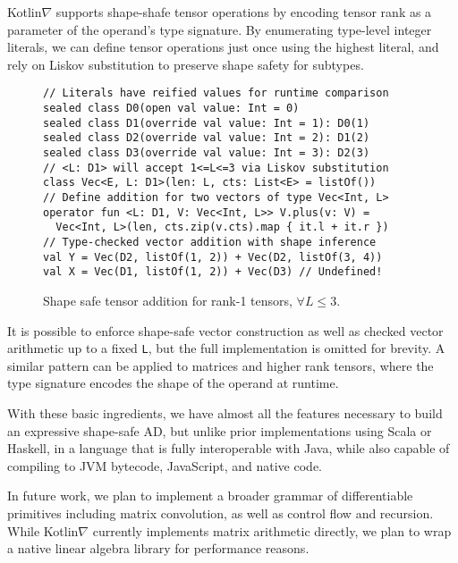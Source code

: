 \documentclass{article}
\begin{document}
\squeezeup Kotlin$\nabla$ supports shape-shafe tensor operations by encoding tensor rank as a parameter of the operand's type signature. By enumerating type-level integer literals, we can define tensor operations just once using the highest literal, and rely on Liskov substitution to preserve shape safety for subtypes.

\squeezeup\begin{figure}[!htb]
\begin{lstlisting}
// Literals have reified values for runtime comparison
sealed class D0(open val value: Int = 0)
sealed class D1(override val value: Int = 1): D0(1)
sealed class D2(override val value: Int = 2): D1(2)
sealed class D3(override val value: Int = 3): D2(3)
// <L: D1> will accept 1<=L<=3 via Liskov substitution
class Vec<E, L: D1>(len: L, cts: List<E> = listOf())
// Define addition for two vectors of type Vec<Int, L>
operator fun <L: D1, V: Vec<Int, L>> V.plus(v: V) =
  Vec<Int, L>(len, cts.zip(v.cts).map { it.l + it.r })
// Type-checked vector addition with shape inference
val Y = Vec(D2, listOf(1, 2)) + Vec(D2, listOf(3, 4))
val X = Vec(D1, listOf(1, 2)) + Vec(D3) // Undefined!
\end{lstlisting}
\caption{Shape safe tensor addition for rank-1 tensors, $\forall L\leq3.$}\squeezeup
\end{figure}
\squeezeup
It is possible to enforce shape-safe vector construction as well as checked vector arithmetic up to a fixed \texttt{L}, but the full implementation is omitted for brevity. A similar pattern can be applied to matrices and higher rank tensors, where the type signature encodes the shape of the operand at runtime.

With these basic ingredients, we have almost all the features necessary to build an expressive shape-safe AD, but unlike prior implementations using Scala or Haskell, in a language that is fully interoperable with Java, while also capable of compiling to JVM bytecode, JavaScript, and native code.

In future work, we plan to implement a broader grammar of differentiable primitives including matrix convolution, as well as control flow and recursion. While Kotlin$\nabla$ currently implements matrix arithmetic directly, we plan to wrap a native linear algebra library for performance reasons.

\squeezeup

\end{document}
